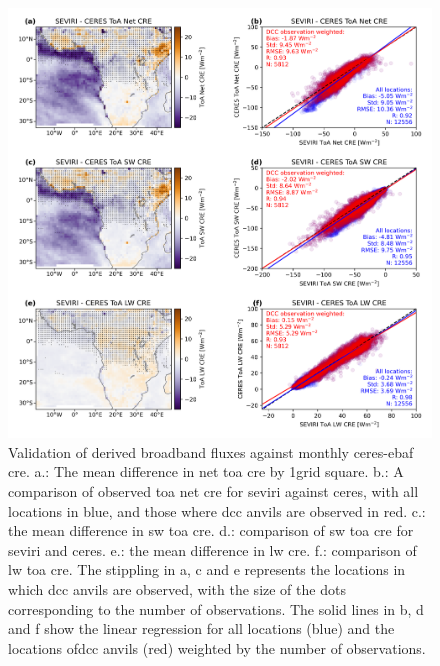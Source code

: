 \begin{figure}[tp]
    \includegraphics[width=\textwidth]{figures/chapter4_03.png}
    \caption[
    Validation of derived broadband fluxes against monthly \acrshort{ceres}-\acrshort{ebaf} \acrshort{cre}
    ]{
    Validation of derived broadband fluxes against monthly \acrshort{ceres}-\acrshort{ebaf} \acrshort{cre}. a.: The mean difference in net \acrshort{toa} \acrshort{cre} by 1\textdegree grid square. b.: A comparison of observed \acrshort{toa} net \acrshort{cre} for \acrshort{seviri} against \acrshort{ceres}, with all locations in blue, and those where \acrshort{dcc} anvils are observed in red. c.: the mean difference in \acrshort{sw} \acrshort{toa} \acrshort{cre}. d.: comparison of \acrshort{sw} \acrshort{toa} \acrshort{cre} for \acrshort{seviri} and \acrshort{ceres}. e.: the mean difference in \acrshort{lw} \acrshort{cre}. f.: comparison of \acrshort{lw} \acrshort{toa} \acrshort{cre}. The stippling in a, c and e represents the locations in which \acrshort{dcc} anvils are observed, with the size of the dots corresponding to the number of observations. The solid lines in b, d and f show the linear regression for all locations (blue) and the locations of\acrshort{dcc} anvils (red) weighted by the number of observations.
    }
    \label{fig:flux_validation}
\end{figure}

